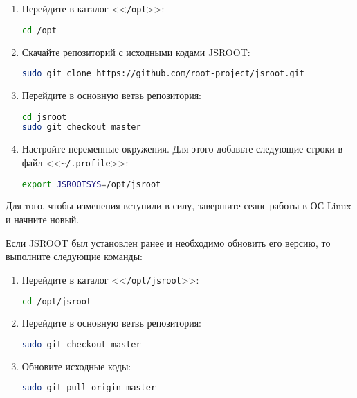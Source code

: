 \documentclass[12pt, a4paper, oneside, onecolumn]{book}
\newcommand{\ROOTJS}{\mbox{JSROOT}}
\newcommand{\DIRECTORY}[1]{<<{\tt #1}>>}
\newcommand{\FILE}[1]{<<{\tt #1}>>}
\begin{document}
\begin{enumerate}
\item Перейдите в каталог \DIRECTORY{/opt}:

\begin{lstlisting}[language=bash]
cd /opt
\end{lstlisting}

\item Скачайте репозиторий с исходными кодами \ROOTJS{}:

\begin{lstlisting}[language=bash]
sudo git clone https://github.com/root-project/jsroot.git
\end{lstlisting}

\item Перейдите в основную ветвь репозитория:

\begin{lstlisting}[language=bash]
cd jsroot
sudo git checkout master
\end{lstlisting}

\item Настройте переменные окружения. Для этого добавьте следующие строки в файл \FILE{\~{}/.profile}:

\begin{lstlisting}[language=bash]
export JSROOTSYS=/opt/jsroot
\end{lstlisting}

\end{enumerate}

Для того, чтобы изменения вступили в силу, завершите сеанс работы в ОС Linux и начните новый.

Если \ROOTJS{} был установлен ранее и необходимо обновить его версию, то выполните следующие команды:

\begin{enumerate}
\item Перейдите в каталог \DIRECTORY{/opt/jsroot}:

\begin{lstlisting}[language=bash]
cd /opt/jsroot
\end{lstlisting}

\item Перейдите в основную ветвь репозитория:

\begin{lstlisting}[language=bash]
sudo git checkout master
\end{lstlisting}

\item Обновите исходные коды:

\begin{lstlisting}[language=bash]
sudo git pull origin master
\end{lstlisting}

\end{enumerate}
\end{document}
